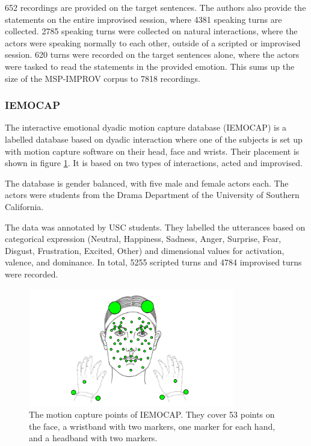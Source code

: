 652 recordings are provided on the target sentences. The authors also provide the statements on the entire improvised session, where 4381 speaking turns are collected. 2785 speaking turns were collected on natural interactions, where the actors were speaking normally to each other, outside of a scripted or improvised session. 620 turns were recorded on the target sentences alone, where the actors were tasked to read the statements in the provided emotion. This sums up the size of the MSP-IMPROV corpus to 7818 recordings. 

\subsubsection{IEMOCAP}
The interactive emotional dyadic motion capture database (IEMOCAP) \cite{busso2008iemocap} is a labelled database based on dyadic interaction where one of the subjects is set up with motion capture software on their head, face and wrists. Their placement is shown in figure \ref{fig:iemocap_cap}. It is based on two types of interactions, acted and improvised.

The database is gender balanced, with five male and female actors each. The actors were students from the Drama Department of the University of Southern California.

The data was annotated by USC students. They labelled the utterances based on categorical expression (Neutral, Happiness, Sadness, Anger, Surprise, Fear, Disgust, Frustration, Excited, Other) and dimensional values for activation, valence, and dominance. In total, 5255 scripted turns and 4784 improvised turns were recorded. 

\begin{figure}
    \centering
    \includegraphics[width=0.8\textwidth]{res/iemocap.png}
    \caption{The motion capture points of IEMOCAP. They cover 53 points on the face, a wristband with two markers, one marker for each hand, and a headband with two markers. \cite{busso2008iemocap}}
    \label{fig:iemocap_cap}
\end{figure}

